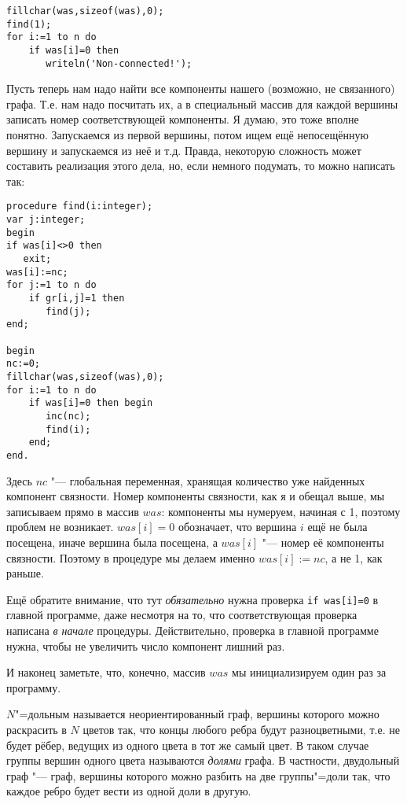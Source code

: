 \begin{codesampleo}\begin{verbatim}
fillchar(was,sizeof(was),0);
find(1);
for i:=1 to n do
    if was[i]=0 then
       writeln('Non-connected!');
\end{verbatim}
\end{codesampleo}

Пусть теперь нам надо найти все компоненты нашего (возможно, не связанного) графа. Т.е. нам надо посчитать их, а в
специальный массив для каждой вершины записать номер соответствующей компоненты. Я думаю, это тоже вполне понятно.
Запускаемся из первой вершины, потом ищем ещё непосещённую вершину и запускаемся из неё и т.д. Правда, некоторую сложность
может составить реализация этого дела, но, если немного подумать, то можно написать так:
\begin{codesample}\begin{verbatim}
procedure find(i:integer);
var j:integer;
begin
if was[i]<>0 then
   exit;
was[i]:=nc;
for j:=1 to n do
    if gr[i,j]=1 then
       find(j);
end;

begin
nc:=0;
fillchar(was,sizeof(was),0);
for i:=1 to n do
    if was[i]=0 then begin
       inc(nc);
       find(i);
    end;
end.
\end{verbatim}
\end{codesample}

Здесь $nc$ "--- глобальная переменная, хранящая количество уже найденных компонент связности. Номер компоненты связности,
как я и обещал выше, мы записываем прямо в массив $was$: компоненты мы нумеруем, начиная с 1, поэтому проблем не возникает.
$was[i]=0$ обозначает, что вершина $i$ ещё не была посещена, иначе вершина была посещена, а $was[i]$ "--- номер
её компоненты связности. Поэтому в процедуре мы делаем именно $was[i]:=nc$, а не 1, как раньше.

Ещё обратите внимание, что тут \textit{обязательно} нужна проверка \texttt{if was[i]=0} в главной программе, даже
несмотря на то, что соответствующая проверка написана \textit{в начале} процедуры. Действительно, проверка в главной
программе нужна, чтобы не увеличить число компонент лишний раз.

И наконец заметьте, что, конечно, массив $was$ мы инициализируем один раз за программу.

$N$"=дольным называется неориентированный граф, вершины которого можно раскрасить в $N$ цветов так, что концы любого 
ребра будут разноцветными, т.е. не будет рёбер, ведущих из одного цвета в тот же самый цвет. В 
таком случае группы вершин одного цвета называются \textit{долями} графа. В частности, двудольный 
граф "--- граф, вершины которого можно разбить на две группы"=доли так, что каждое ребро будет 
вести из одной доли в другую.

